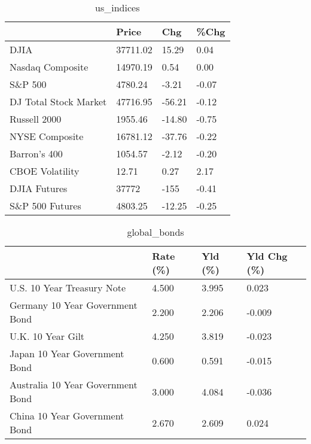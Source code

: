 \documentclass{article}%
\begin{document}
%


\begin{table}[htbp]%
\caption{us\_indices}%
\centering%
\begin{adjustbox}{width=1\textwidth}%
\begin{tabular}{llll}
\toprule
                      &    Price &    Chg &  \%Chg \\
\midrule
                 DJIA & 37711.02 &  15.29 &  0.04 \\
     Nasdaq Composite & 14970.19 &   0.54 &  0.00 \\
              S\&P 500 &  4780.24 &  -3.21 & -0.07 \\
DJ Total Stock Market & 47716.95 & -56.21 & -0.12 \\
         Russell 2000 &  1955.46 & -14.80 & -0.75 \\
       NYSE Composite & 16781.12 & -37.76 & -0.22 \\
         Barron's 400 &  1054.57 &  -2.12 & -0.20 \\
      CBOE Volatility &    12.71 &   0.27 &  2.17 \\
         DJIA Futures &    37772 &   -155 & -0.41 \\
      S\&P 500 Futures &  4803.25 & -12.25 & -0.25 \\
\bottomrule
\end{tabular}
%
\end{adjustbox}%
\end{table}

%


\begin{table}[htbp]%
\caption{global\_bonds}%
\centering%
\begin{adjustbox}{width=1\textwidth}%
\begin{tabular}{llll}
\toprule
                                  & Rate (\%) & Yld (\%) & Yld Chg (\%) \\
\midrule
       U.S. 10 Year Treasury Note &    4.500 &   3.995 &       0.023 \\
  Germany 10 Year Government Bond &    2.200 &   2.206 &      -0.009 \\
                U.K. 10 Year Gilt &    4.250 &   3.819 &      -0.023 \\
    Japan 10 Year Government Bond &    0.600 &   0.591 &      -0.015 \\
Australia 10 Year Government Bond &    3.000 &   4.084 &      -0.036 \\
    China 10 Year Government Bond &    2.670 &   2.609 &       0.024 \\
\bottomrule
\end{tabular}
%
\end{adjustbox}%
\end{table}
\end{document}
